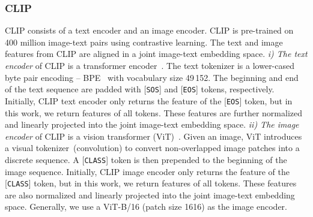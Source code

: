 \documentclass[lettersize,journal]{IEEEtran}
\begin{document}
\subsubsection{CLIP}
CLIP consists of a text encoder and an image encoder.
CLIP is pre-trained on 400 million image-text pairs using contrastive learning.
The text and image features from CLIP are aligned in a joint image-text embedding space.
\textit{i) The text encoder} of CLIP is a transformer encoder~\cite{2017_attention,2019_bert}.
The text tokenizer is a lower-cased byte pair encoding -- BPE~\cite{2016_bpe} with vocabulary size 49\,152.
The beginning and end of the text sequence are padded 
with [\texttt{SOS}] and [\texttt{EOS}] tokens, respectively.
Initially, 
CLIP text encoder only returns the feature of the [\texttt{EOS}] token,
but in this work, we return features of all tokens.
These features are further normalized and linearly projected into the joint image-text embedding space.
\textit{ii) The image encoder} of CLIP is a vision transformer (ViT)~\cite{2021_vit}.
Given an image, ViT introduces a visual tokenizer~(convolution) to convert non-overlapped image patches into a discrete sequence.
A [\texttt{CLASS}] token is then prepended to the beginning of the image sequence.
Initially, 
CLIP image encoder only returns the feature of the [\texttt{CLASS}] token,
but in this work, we return features of all tokens.
These features are also normalized
and linearly projected into the joint image-text embedding space. Generally, we use a ViT-B/16 (patch size 1616) as the image encoder.
\end{document}
